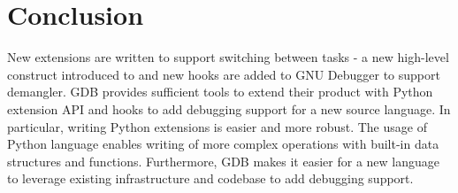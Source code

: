 \chapter{Conclusion}
New extensions are written to support switching between tasks - a new
high-level construct introduced to \uCPP and new hooks are added to GNU
Debugger to support \CFA demangler. GDB provides sufficient tools to extend
their product with Python extension API and hooks to add debugging support for a
new source language. In particular, writing Python extensions is easier and more
robust. The usage of Python language enables writing of
more complex operations with built-in data structures and functions.
Furthermore, GDB makes it easier for a new language to leverage existing
infrastructure and codebase to add debugging support.

